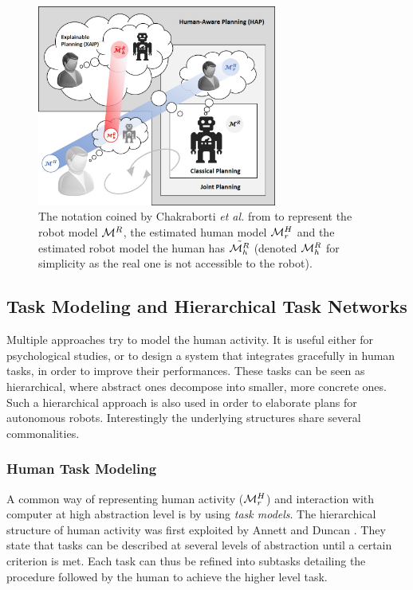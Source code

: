 \documentclass[a4paper,11pt,twoside]{StyleThese}
\begin{document}
\begin{figure}
\centering
\includegraphics[width=0.7\textwidth]{figures/chapter1/chkraborti3models.png}
\caption{The notation coined by Chakraborti \textit{et al.} from \cite{chakraborti2018human} to represent the robot model $\mathcal{M}^R$, the estimated human model $\mathcal{M}^H_r$ and the estimated robot model the human has $\tilde{\mathcal{M}^R_h}$ (denoted $\mathcal{M}^R_h$ for simplicity as the real one is not accessible to the robot).}
\label{fig:chakraborti3models}
\end{figure}

\subsection{Task Modeling and Hierarchical Task Networks}
Multiple approaches try to model the human activity. It is useful either for psychological studies, or to design a system that integrates gracefully in human tasks, in order to improve their performances. These tasks can be seen as hierarchical, where abstract ones decompose into smaller, more concrete ones. Such a hierarchical approach is also used in order to elaborate plans for autonomous robots. Interestingly the underlying structures share several commonalities.

\subsubsection{Human Task Modeling}
A common way of representing human activity ($\mathcal{M}^H_r$) and interaction with computer at high abstraction level is by using \textit{task models}. The hierarchical structure of human activity was first exploited by Annett and Duncan \cite{annett1967task}. They state that tasks can be described at several levels of abstraction until a certain criterion is met. Each task can thus be refined into subtasks detailing the procedure followed by the human to achieve the higher level task.
\end{document}
